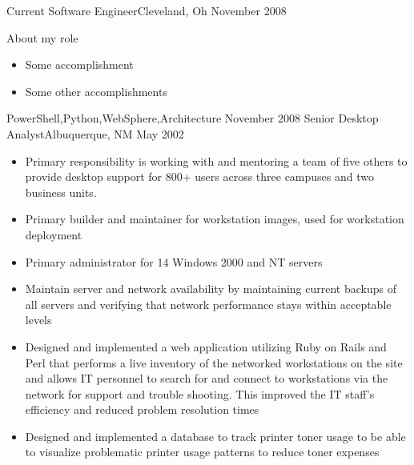 %
%
%

\begin{experiences}
  \experience
    {Current}       {Software Engineer}{}{Cleveland, Oh}
    {November 2008} {
                      About my role
                      \begin{itemize}
                        \item Some accomplishment
                        \item Some other accomplishments
                      \end{itemize}
                    }
                    {PowerShell,Python,WebSphere,Architecture}
  \emptySeparator
  \experience
    {November 2008} {Senior Desktop Analyst}{}{Albuquerque, NM}
    {May 2002}    {
                      \begin{itemize}
                        \item Primary responsibility is working with and mentoring a team of five others to provide desktop support for 800+ users across three campuses and two business units.
                        \item Primary builder and maintainer for workstation images, used for workstation deployment
                        \item Primary administrator for 14 Windows 2000 and NT servers
                        \item Maintain server and network availability by maintaining current backups of all servers and verifying that network performance stays within acceptable levels
                        \item Designed and implemented a web application utilizing Ruby on Rails and Perl that performs a live inventory of the networked workstations on the site and allows IT personnel to search for and connect to workstations via the network for support and trouble shooting. This improved the IT staff’s efficiency and reduced problem resolution times
                        \item Designed and implemented a database to track printer toner usage to be able to visualize problematic printer usage patterns to reduce toner expenses

\end{itemize}}
\end{experiences}
